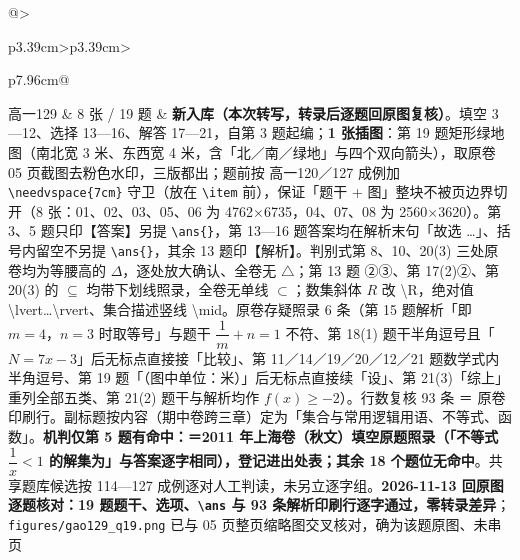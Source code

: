 \documentclass[a4paper,11pt]{article}
\begin{document}
\begin{xltabular}{\textwidth}{@{}>{\raggedright\arraybackslash}p{3.39cm}>{\centering\arraybackslash}p{3.39cm}>{\raggedright\arraybackslash}p{7.96cm}@{}}
高一129 & 8 张 / 19 题 & \textbf{新入库（本次转写，转录后逐题回原图复核）}。填空 3---12、选择 13---16、解答 17---21，自第 3 题起编；\textbf{1 张插图}：第 19 题矩形绿地图（南北宽 3 米、东西宽 4 米，含「北／南／绿地」与四个双向箭头），取原卷 05 页截图去粉色水印，三版都出；题前按 高一120／127 成例加 \texttt{\textbackslash{}needvspace\{7cm\}} 守卫（放在 \texttt{\textbackslash{}item} 前），保证「题干 + 图」整块不被页边界切开（8 张：01、02、03、05、06 为 4762$\times$6735，04、07、08 为 2560$\times$3620）。第 3、5 题只印【答案】另提 \texttt{\textbackslash{}ans\{\}}，第 13---16 题答案均在解析末句「故选 \ldots」、括号内留空不另提 \texttt{\textbackslash{}ans\{\}}，其余 13 题印【解析】。判别式第 8、10、20(3) 三处原卷均为等腰高的 \(\Delta\)，逐处放大确认、全卷无 \(\triangle\)；第 13 题 ②③、第 17(2)②、第 20(3) 的 \(\subseteq\allowbreak \) 均带下划线照录，全卷无单线 \(\subset\allowbreak \)；数集斜体 \(R\) 改 \textbackslash R，绝对值 \textbackslash lvert\ldots\textbackslash rvert、集合描述竖线 \textbackslash mid。原卷存疑照录 6 条（第 15 题解析「即 \(m=\allowbreak 4\)，\(n=\allowbreak 3\) 时取等号」与题干 \(\dfrac1m+n=\allowbreak 1\) 不符、第 18(1) 题干半角逗号且「\(N=\allowbreak 7x-3\)」后无标点直接接「比较」、第 11／14／19／20／12／21 题数学式内半角逗号、第 19 题「（图中单位：米）」后无标点直接续「设」、第 21(3)「综上」重列全部五类、第 21(2) 题干与解析均作 \(f(x)\geqslant\allowbreak -2\)）。行数复核 93 条 ＝ 原卷印刷行。副标题按内容（期中卷跨三章）定为「集合与常用逻辑用语、不等式、函数」。\textbf{机判仅第 5 题有命中：＝2011 年上海卷（秋文）填空原题照录（「不等式 \(\dfrac1x<1\) 的解集为」与答案逐字相同），登记进出处表；其余 18 个题位无命中}。共享题库候选按 114---127 成例逐对人工判读，未另立逐字组。\textbf{2026-11-13 回原图逐题核对：19 题题干、选项、\texttt{\textbackslash{}ans} 与 93 条解析印刷行逐字通过，零转录差异}；\texttt{figures/\allowbreak{}gao129\_q19.png} 已与 05 页整页缩略图交叉核对，确为该题原图、未串页 \\ \addlinespace[1pt]

\end{xltabular}
\end{document}
